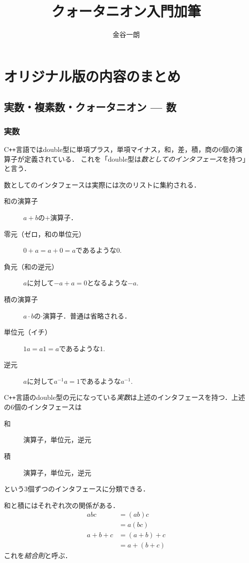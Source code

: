 \documentclass{jsbook}
\title{クォータニオン入門加筆}
\author{金谷一朗}
\newcommand{\cxx}{\textrm{C}\texttt{++}}
\newcommand{\keyword}[1]{\emph{#1}}
\newcommand{\zero}{0}%
\newcommand{\one}{1}%
\begin{document}
\setlength{\baselineskip}{17pt}
\setcounter{chapter}{-1}

\maketitle
\tableofcontents

\chapter{オリジナル版の内容のまとめ}

\section{実数・複素数・クォータニオン --- 数}

\subsection{実数}

\cxx 言語ではdouble型に単項プラス，単項マイナス，和，差，積，商の6個の演算子が定義されている．
これを「double型は\keyword{数としてのインタフェース}を持つ」と言う．

数としてのインタフェースは実際には次のリストに集約される．
\begin{description}
\item[和の演算子] $a+b$の$+$演算子．
\item[零元（ゼロ，和の単位元）] $\zero+a=a+\zero=a$であるような$\zero.$
\item[負元（和の逆元）] $a$に対して$-a+a=\zero$となるような$-a.$
\item[積の演算子] $a\cdot b$の$\cdot$演算子．普通は省略される．
\item[単位元（イチ）] $\one a=a\one=a$であるような$\one.$
\item[逆元] $a$に対して$a^{-1}a=\one$であるような$a^{-1}.$
\end{description}
\cxx 言語のdouble型の元になっている\keyword{実数}は上述のインタフェースを持つ．上述の6個のインタフェースは
\begin{description}
\item[和] 演算子，単位元，逆元
\item[積] 演算子，単位元，逆元
\end{description}
という3個ずつのインタフェースに分類できる．

和と積にはそれぞれ次の関係がある．
\begin{align}
abc&=(ab)c\\
  &=a(bc)\\
a+b+c&=(a+b)+c\\
  &=a+(b+c)
\end{align}
これを\keyword{結合則}と呼ぶ．
\end{document}
